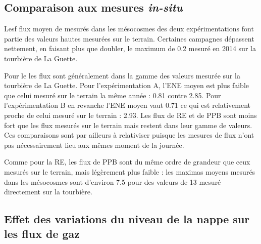 \subsection{Comparaison aux mesures \textit{in-situ}}

Lesf flux moyen de \chh mesurés dans les mésocosmes des deux expérimentations font partie des valeurs hautes mesurées sur le terrain.
Certaines campagnes dépassent nettement, en faisant plus que doubler, le maximum de \SI{0.2}{\uml} mesuré en 2014 sur la tourbière de La Guette.

Pour le \coo les flux sont généralement dans la gamme des valeurs mesurée sur la tourbière de La Guette.
Pour l'expérimentation A, l'ENE moyen est plus faible que celui mesuré sur le terrain la même année : \num{0.81} contre \SI{2.85}{\uml}.
Pour l'expérimentation B en revanche l'ENE moyen vaut \SI{0.71}{\uml} ce qui est relativement proche de celui mesuré sur le terrain : \SI{2.93}{\uml}.
Les flux de RE et de PPB sont moins fort que les flux mesurés sur le terrain mais restent dans leur gamme de valeurs.
Ces comparaisons sont par ailleurs à relativiser puisque les mesures de flux n'ont pas nécessairement lieu aux mêmes moment de la journée.


%
%
%


Comme pour la RE, les flux de PPB sont du même ordre de grandeur que ceux mesurés sur le terrain, mais légèrement plus faible : les maximas moyens mesurés dans les mésocosmes sont d'environ \num{7.5} pour des valeurs de \SI{13}{\uml} mesuré directement sur la tourbière.

\subsection{Effet des variations du niveau de la nappe sur les flux de gaz}

